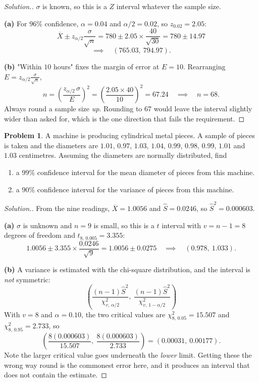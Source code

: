 \documentclass[11pt,a4paper]{article}
\theoremstyle{definition}
\newtheorem{problemx}{Problem}[section]
\newenvironment{problem}{\begin{problemx}}{\end{problemx}}
\newenvironment{solution}
  {\renewcommand{\qedsymbol}{}\begin{proof}[\textit{Solution}.]}
  {\end{proof}}
\begin{document}
\begin{solution}
$\sigma$ is known, so this is a $Z$ interval whatever the sample size.

\textbf{(a)} For $96\%$ confidence, $\alpha=0.04$ and $\alpha/2=0.02$, so $z_{0.02}=2.05$:
\[\overline{X}\pm z_{\alpha/2}\frac{\sigma}{\sqrt{n}}
=780\pm 2.05\times\frac{40}{\sqrt{30}}=780\pm 14.97\]
\[\implies\quad (765.03,\ 794.97).\]

\textbf{(b)} "Within $10$ hours" fixes the margin of error at $E=10$. Rearranging
$E=z_{\alpha/2}\frac{\sigma}{\sqrt{n}}$,
\[n=\left(\frac{z_{\alpha/2}\,\sigma}{E}\right)^2=\left(\frac{2.05\times 40}{10}\right)^2=67.24
\quad\implies\quad n=68.\]
Always round a sample size \emph{up}. Rounding to $67$ would leave the interval slightly
wider than asked for, which is the one direction that fails the requirement.
\end{solution}

\begin{problem}
A machine is producing cylindrical metal pieces. A sample of pieces is taken and the
diameters are $1.01$, $0.97$, $1.03$, $1.04$, $0.99$, $0.98$, $0.99$, $1.01$ and $1.03$
centimetres. Assuming the diameters are normally distributed, find
\begin{enumerate}
\item[(a).] a $99\%$ confidence interval for the mean diameter of pieces from this machine.
\item[(b).] a $90\%$ confidence interval for the variance of pieces from this machine.
\end{enumerate}
\end{problem}

\begin{solution}
From the nine readings, $\overline{X}=1.0056$ and $\widehat{S}=0.0246$, so
$\widehat{S}^2=0.000603$.

\textbf{(a)} $\sigma$ is unknown and $n=9$ is small, so this is a $t$ interval with
$v=n-1=8$ degrees of freedom and $t_{8,\,0.005}=3.355$:
\[1.0056\pm 3.355\times\frac{0.0246}{\sqrt{9}}=1.0056\pm 0.0275
\quad\implies\quad (0.978,\ 1.033).\]

\textbf{(b)} A variance is estimated with the chi-square distribution, and the interval is
\emph{not} symmetric:
\[\left(\frac{(n-1)\widehat{S}^2}{\chi^2_{v,\,\alpha/2}},\ \frac{(n-1)\widehat{S}^2}{\chi^2_{v,\,1-\alpha/2}}\right)\]
With $v=8$ and $\alpha=0.10$, the two critical values are $\chi^2_{8,\,0.05}=15.507$ and
$\chi^2_{8,\,0.95}=2.733$, so
\[\left(\frac{8(0.000603)}{15.507},\ \frac{8(0.000603)}{2.733}\right)=(0.00031,\ 0.00177).\]
Note the larger critical value goes underneath the \emph{lower} limit. Getting these the
wrong way round is the commonest error here, and it produces an interval that does not
contain the estimate.
\end{solution}
\end{document}
